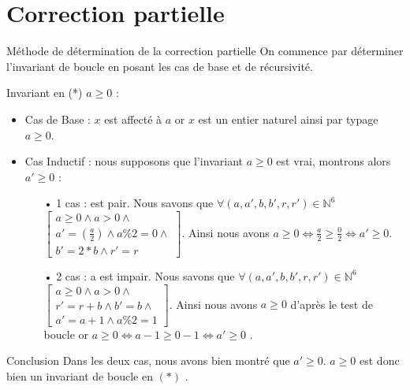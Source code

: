\documentclass[12pt,a4paper]{report}
\begin{document}
\section{Correction partielle}
\begin{mybox}{Méthode de détermination de la correction partielle}
On commence par déterminer l'invariant de boucle en posant les cas de base
et de récursivité.
\end{mybox}
\begin{flushleft}
Invariant en (*) $  a\geq 0 $  : \\
\begin{itemize}
\item Cas de Base :  $x$ est affect\'{e} \`{a} $a$ or $x$ est un entier naturel ainsi par typage $a\ge 0$.
\item Cas Inductif : nous supposons que l'invariant  $a\ge 0$ est vrai, montrons alors $ a' \geq 0 $ :
\begin{itemize}
\item[•]  1 cas :  est pair. Nous savons que $\forall(a,a',b,b',r,r')\in \mathbb{N}^{6}$ $\left[ \begin{array}{c}a\ge 0\wedge a>0\wedge \\
   a '=(\frac{a}{2})\wedge a\%2=0 \wedge \\
b '=2*b\wedge r '=r\end{array}
\right]$. Ainsi nous avons $a\ge 0\Leftrightarrow \frac{a}{2}\ge \frac{0}{2}\Leftrightarrow a ' \ge 0$.
\item[•] 2 cas : a est impair. Nous savons que $\forall(a,a',b,b',r,r')\in \mathbb{N}^{6}$ $\left[ \begin{array}{c}a\ge 0\wedge a>0\wedge \\
   r '= r+b\wedge b'=b  \wedge \\
a '=a+1\wedge a\%2=1\end{array}
\right]$. Ainsi nous avons  $a\ge 0$ d’après le test de boucle or  $  a\geq 0  \Leftrightarrow a-1 \ge 0-1 \Leftrightarrow a' \ge 0$ .
\bigskip
\end{itemize}
\end{itemize}
\begin{Cas1}{Conclusion}
 Dans les deux cas, nous avons bien montré que  $ a' \ge 0 $. $a \geq 0$ est donc bien un invariant de boucle en $(*)$ .
\end{Cas1}
\end{flushleft}
\end{document}
